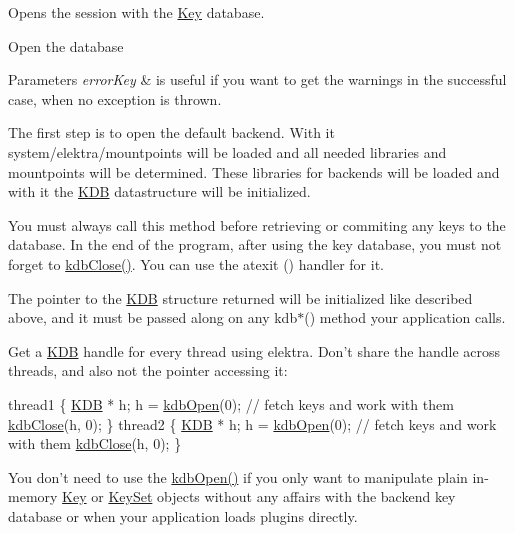 Opens the session with the \hyperlink{classkdb_1_1Key}{Key} database.  

Open the database


\begin{DoxyParams}{Parameters}
{\em error\-Key} & is useful if you want to get the warnings in the successful case, when no exception is thrown.\\
\hline
\end{DoxyParams}
The first step is to open the default backend. With it system/elektra/mountpoints will be loaded and all needed libraries and mountpoints will be determined. These libraries for backends will be loaded and with it the {\ttfamily \hyperlink{classkdb_1_1KDB}{K\-D\-B}} datastructure will be initialized.

You must always call this method before retrieving or commiting any keys to the database. In the end of the program, after using the key database, you must not forget to \hyperlink{group__kdb_gadb54dc9fda17ee07deb9444df745c96f}{kdb\-Close()}. You can use the atexit () handler for it.

The pointer to the {\ttfamily \hyperlink{classkdb_1_1KDB}{K\-D\-B}} structure returned will be initialized like described above, and it must be passed along on any kdb$\ast$() method your application calls.

Get a {\ttfamily \hyperlink{classkdb_1_1KDB}{K\-D\-B}} handle for every thread using elektra. Don't share the handle across threads, and also not the pointer accessing it\-: 
\begin{DoxyCode}
thread1
\{
        \hyperlink{classkdb_1_1KDB_a7e0637995ce9f294cdbc6f167df6db40}{KDB} * h;
        h = \hyperlink{group__kdb_ga6808defe5870f328dd17910aacbdc6ca}{kdbOpen}(0);
        \textcolor{comment}{// fetch keys and work with them}
        \hyperlink{group__kdb_gadb54dc9fda17ee07deb9444df745c96f}{kdbClose}(h, 0);
\}
thread2
\{
        \hyperlink{classkdb_1_1KDB_a7e0637995ce9f294cdbc6f167df6db40}{KDB} * h;
        h = \hyperlink{group__kdb_ga6808defe5870f328dd17910aacbdc6ca}{kdbOpen}(0);
        \textcolor{comment}{// fetch keys and work with them}
        \hyperlink{group__kdb_gadb54dc9fda17ee07deb9444df745c96f}{kdbClose}(h, 0);
\}
\end{DoxyCode}


You don't need to use the \hyperlink{group__kdb_ga6808defe5870f328dd17910aacbdc6ca}{kdb\-Open()} if you only want to manipulate plain in-\/memory \hyperlink{classkdb_1_1Key}{Key} or \hyperlink{classkdb_1_1KeySet}{Key\-Set} objects without any affairs with the backend key database or when your application loads plugins directly.



